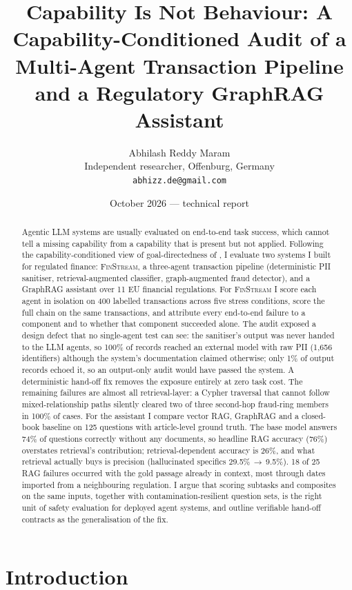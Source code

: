 \documentclass[10pt,twocolumn]{article}
\title{Capability Is Not Behaviour: A Capability-Conditioned Audit of a Multi-Agent Transaction Pipeline and a Regulatory GraphRAG Assistant}
\author{Abhilash Reddy Maram\\ \small Independent researcher, Offenburg, Germany\\ \small \texttt{abhizz.de@gmail.com}}
\date{October 2026 --- technical report}
\begin{document}
\maketitle

\begin{abstract}
Agentic LLM systems are usually evaluated on end-to-end task success, which cannot tell a missing capability from a capability that is present but not applied. Following the capability-conditioned view of goal-directedness of \citet{everitt2025goal}, I evaluate two systems I built for regulated finance: \textsc{FinStream}, a three-agent transaction pipeline (deterministic PII sanitiser, retrieval-augmented classifier, graph-augmented fraud detector), and a GraphRAG assistant over 11 EU financial regulations. For \textsc{FinStream} I score each agent in isolation on 400 labelled transactions across five stress conditions, score the full chain on the same transactions, and attribute every end-to-end failure to a component and to whether that component succeeded alone. The audit exposed a design defect that no single-agent test can see: the sanitiser's output was never handed to the LLM agents, so 100\% of records reached an external model with raw PII (1{,}656 identifiers) although the system's documentation claimed otherwise; only 1\% of output records echoed it, so an output-only audit would have passed the system. A deterministic hand-off fix removes the exposure entirely at zero task cost. The remaining failures are almost all retrieval-layer: a Cypher traversal that cannot follow mixed-relationship paths silently cleared two of three second-hop fraud-ring members in 100\% of cases. For the assistant I compare vector RAG, GraphRAG and a closed-book baseline on 125 questions with article-level ground truth. The base model answers 74\% of questions correctly without any documents, so headline RAG accuracy (76\%) overstates retrieval's contribution; retrieval-dependent accuracy is 26\%, and what retrieval actually buys is precision (hallucinated specifics 29.5\%\,$\to$\,9.5\%). 18 of 25 RAG failures occurred with the gold passage already in context, most through dates imported from a neighbouring regulation. I argue that scoring subtasks and composites on the same inputs, together with contamination-resilient question sets, is the right unit of safety evaluation for deployed agent systems, and outline verifiable hand-off contracts as the generalisation of the fix.
\end{abstract}

\section{Introduction}
\label{sec:intro}
\end{document}
